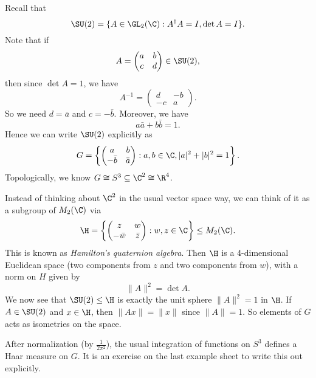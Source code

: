 \documentclass[a4paper]{article}
\begin{document}
Recall that
\[
  \SU(2) = \{A \in \GL_2(\C): A^\dagger A = I, \det A = I\}.
\]
Note that if
\[
  A =
  \begin{pmatrix}
    a & b\\
    c & d
  \end{pmatrix} \in \SU(2),
\]
then since $\det A = 1$, we have
\[
  A^{-1} =
  \begin{pmatrix}
    d & -b\\
    -c & a
  \end{pmatrix}.
\]
So we need $d = \bar{a}$ and $c = -\bar{b}$. Moreover, we have
\[
  a\bar{a} + b\bar{b} = 1.
\]
Hence we can write $\SU(2)$ explicitly as
\[
  G = \left\{
    \begin{pmatrix}
      a & b\\
      -\bar{b} & \bar{a}
    \end{pmatrix}: a, b \in \C, |a|^2 + |b|^2 = 1
  \right\}.
\]
Topologically, we know $G \cong S^3 \subseteq \C^2 \cong \R^4$.

Instead of thinking about $\C^2$ in the usual vector space way, we can think of it as a subgroup of $M_2(\C)$ via
\[
  \H = \left\{
    \begin{pmatrix}
      z & w\\
      -\bar{w} & \bar{z}
    \end{pmatrix}:
  w, z \in \C\right\} \leq M_2(\C).
\]
This is known as \emph{Hamilton's quaternion algebra}. Then $\H$ is a 4-dimensional Euclidean space (two components from $z$ and two components from $w$), with a norm on $H$ given by
\[
  \|A\|^2 = \det A.
\]
We now see that $\SU(2) \leq \H$ is exactly the unit sphere $\|A\|^2 = 1$ in $\H$. If $A \in \SU(2)$ and $x \in \H$, then $\|Ax\| = \|x\|$ since $\|A\| = 1$. So elements of $G$ acts as isometries on the space.

After normalization (by $\frac{1}{2\pi^2}$), the usual integration of functions on $S^3$ defines a Haar measure on $G$. It is an exercise on the last example sheet to write this out explicitly.
\end{document}
